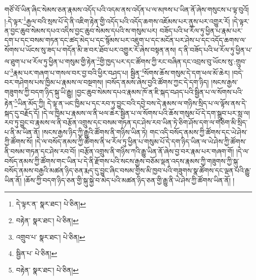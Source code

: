 གཙོ་བོ་ཡིན་ཞིང་སེམས་ཅན་རྣམས་འདོད་པའི་འདམ་ནས་འདོན་པ་ལ་མཁས་པ་ཡིན་ནོ་ཞེས་གསུངས་པ་ལྟ་བུའོ། །:དེ་ལྟར་\footnote{དེ་ལྟར་ན་  སྣར་ཐང་།  པེ་ཅིན། }རྒྱལ་བའི་སྲས་པོ་དེ་ནི་འཇིག་རྟེན་གྱི་འདོད་པའི་འདོད་ཆགས་འཇོམས་པར་ནུས་པར་འགྱུར་རོ། །དེ་ལྟར་ན་བྱང་ཆུབ་སེམས་དཔའ་འདིས་བྱང་ཆུབ་སེམས་དཔའི་ས་གསུམ་པར། བཟོད་པའི་ཕ་རོལ་ཏུ་ཕྱིན་པ་རྣམ་པར་དག་པ་དང་བསམ་གཏན་དང་ཚད་མེད་པ་དང་སྙོམས་པར་འཇུག་པ་དང་མངོན་པར་ཤེས་པ་དང་འདོད་ཆགས་ལ་སོགས་པ་ཡོངས་སུ་ཟད་པ་གདོན་མི་ཟ་བར་ཐོབ་པར་འགྱུར་རོ་ཞེས་བསྟན་ནས། ད་ནི་བཟོད་པའི་ཕ་རོལ་ཏུ་ཕྱིན་པ་ལ་ཐུག་པ་ཕ་རོལ་ཏུ་ཕྱིན་པ་གསུམ་གྱི་རྟེན་\footnote{བརྟེན་  སྣར་ཐང་།  པེ་ཅིན། }གྱི་ཁྱད་པར་དང་ཚོགས་ཀྱི་རང་བཞིན་དང་འབྲས་བུ་ཡོངས་སུ་:གྲུབ་པ་\footnote{འགྲུབ་པ་  སྣར་ཐང་།  པེ་ཅིན། }རྣམ་པར་གཞག་པ་གསལ་བར་བྱ་བའི་ཕྱིར་བཤད་པ། སྦྱིན་\footnote{སྦྱིན་པ་  པེ་ཅིན། }སོགས་ཆོས་གསུམ་དེ་དག་ཕལ་མོ་ཆེར། །བདེ་བར་གཤེགས་པས་ཁྱིམ་པ་རྣམས་ལ་བསྔགས། །བསོད་ནམས་ཞེས་བྱའི་ཚོགས་ཀྱང་དེ་དག་ཉིད། །སངས་རྒྱས་གཟུགས་ཀྱི་བདག་ཉིད་སྐུ་ཡི་རྒྱུ། །བྱང་ཆུབ་སེམས་དཔའ་རྣམས་ཁོ་ན་ཇི་སྐད་བཤད་པའི་སྦྱིན་པ་ལ་སོགས་པའི་རྟེན་\footnote{བརྟེན་  སྣར་ཐང་།  པེ་ཅིན། }ཡིན་མོད་ཀྱི། དེ་ལྟ་ན་ཡང་ཁྱིམ་པ་དང་རབ་ཏུ་བྱུང་བའི་དབྱེ་བས་དེ་རྣམས་ལ་གཉིས་སྲིད་པ་ལ་ལྟོས་ནས་དེ་སྐད་དུ་བརྗོད་དོ། །དེ་ལ་ཁྱིམ་པ་རྣམས་ལ་ནི་ཕལ་ཆེར་སྦྱིན་པ་ལ་སོགས་པའི་ཆོས་གསུམ་པོ་དེ་དག་སྒྲུབ་པར་སླ་ལ། རབ་ཏུ་བྱུང་བ་རྣམས་ལ་ནི་བརྩོན་འགྲུས་དང་བསམ་གཏན་དང་ཤེས་རབ་ཡིན་ཏེ་ཅིག་ཤོས་དག་ལ་གཅིག་མི་སྲིད་པ་ནི་མ་ཡིན་ནོ། །སངས་རྒྱས་ཉིད་ཀྱི་རྒྱུའི་ཚོགས་ནི་གཉིས་ཡིན་ཏེ། གང་འདི་བསོད་ནམས་ཀྱི་ཚོགས་དང་ཡེ་ཤེས་ཀྱི་ཚོགས་སོ། །དེ་ལ་བསོད་ནམས་ཀྱི་ཚོགས་ནི་ཕ་རོལ་ཏུ་ཕྱིན་པ་གསུམ་པོ་དེ་དག་ཉིད་ཡིན་ལ་ཡེ་ཤེས་ཀྱི་ཚོགས་ནི་བསམ་གཏན་དང་ཤེས་རབ་བོ། །བརྩོན་འགྲུས་ནི་གཉིས་ཀའི་རྒྱུ་ཡིན་ནོ་ཞེས་བྱ་བར་རྣམ་པར་གཞག་གོ། །དེ་ལ་བསོད་ནམས་ཀྱི་ཚོགས་གང་ཡིན་པ་དེ་ནི་རྫོགས་པའི་སངས་རྒྱས་བཅོམ་ལྡན་འདས་རྣམས་ཀྱི་གཟུགས་ཀྱི་སྐུ་བསོད་ནམས་བརྒྱའི་མཚན་ཉིད་ཅན་རྨད་དུ་བྱུང་ཞིང་བསམ་གྱིས་མི་ཁྱབ་པའི་གཟུགས་སྣ་ཚོགས་དང་ལྡན་པའི་རྒྱུ་ཡིན་ནོ། །ཆོས་ཀྱི་བདག་ཉིད་ཅན་གྱི་སྐུ་སྐྱེ་བ་མེད་པའི་མཚན་ཉིད་ཅན་གྱི་རྒྱུ་ནི་ཡེ་ཤེས་ཀྱི་ཚོགས་ཡིན་ནོ། །
